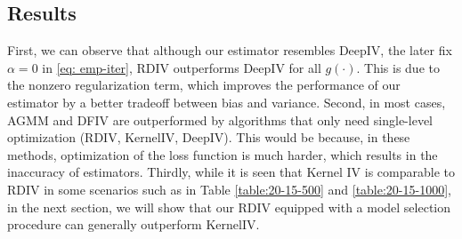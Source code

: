 \subsection{Results}

First, we can observe that although our estimator resembles DeepIV, the later fix $\alpha =0$ in \eqref{eq: emp-iter}, RDIV outperforms DeepIV for all $g(\cdot)$.  This is due to the nonzero regularization term, which improves the performance of our estimator by a better tradeoff between bias and variance. Second, in most cases, AGMM and DFIV are outperformed by algorithms that only need single-level optimization (RDIV, KernelIV, DeepIV). This would be because, in these methods, optimization of the loss function is much harder, which results in the inaccuracy of estimators. Thirdly, while it is seen that Kernel IV is comparable to RDIV in some scenarios such as in Table \ref{table:20-15-500} and \ref{table:20-15-1000}, in the next section, we will show that our RDIV equipped with a model selection procedure can generally outperform KernelIV. 




